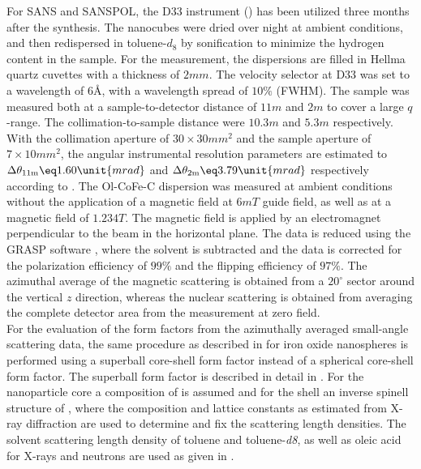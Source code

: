 \documentclass[\main/dresen_thesis.tex]{subfiles}
\begin{document}
    For SANS and SANSPOL, the D33 instrument () has been utilized three months after the synthesis.
    The nanocubes were dried over night at ambient conditions, and then redispersed in toluene-$\mathit{d_8}$ by sonification to minimize the hydrogen content in the sample.
    For the measurement, the dispersions are filled in Hellma quartz cuvettes with a thickness of $2 \unit{mm}$.
    The velocity selector at D33 was set to a wavelength of $6 \unit{\angstrom}$, with a wavelength spread of $10 \%$ (FWHM).
    The sample was measured both at a sample-to-detector distance of $11 \unit{m}$ and $2 \unit{m}$ to cover a large $q$-range.
    The collimation-to-sample distance were $10.3 \unit{m}$ and $5.3 \unit{m}$ respectively.
    With the collimation aperture of $30 \times 30 \unit{mm^2}$ and the sample aperture of $7 \times 10 \unit{mm^2}$, the angular instrumental resolution parameters are estimated to $\Delta \theta_\mathrm{11 m} \eq 1.60 \unit{mrad}$ and $\Delta \theta_\mathrm{2 m} \eq 3.79 \unit{mrad}$ respectively according to .
    The Ol-CoFe-C dispersion was measured at ambient conditions without the application of a magnetic field at $6 \unit{mT}$ guide field, as well as at a magnetic field of $1.234 \unit{T}$. %
    The magnetic field is applied by an electromagnet perpendicular to the beam in the horizontal plane.
    The data is reduced using the GRASP software \cite{Dewhurst_2003_Grasp}, where the solvent is subtracted and the data is corrected for the polarization efficiency of $99 \%$ and the flipping efficiency of $97 \%$.
    The azimuthal average of the magnetic scattering is obtained from a $20 ^\circ$ sector around the vertical $z$ direction, whereas the nuclear scattering is obtained from averaging the complete detector area from the measurement at zero field.
    \\

    For the evaluation of the form factors from the azimuthally averaged small-angle scattering data, the same procedure as described in  for iron oxide nanospheres is performed using a superball core-shell form factor instead of a spherical core-shell form factor.
    The superball form factor is described in detail in .
    For the nanoparticle core a composition of  is assumed and for the shell an inverse spinell structure of , where the composition and lattice constants as estimated from X-ray diffraction are used to determine and fix the scattering length densities.
    The solvent scattering length density of toluene and toluene-\textit{d8}, as well as oleic acid for X-rays and neutrons are used as given in .
\end{document}
